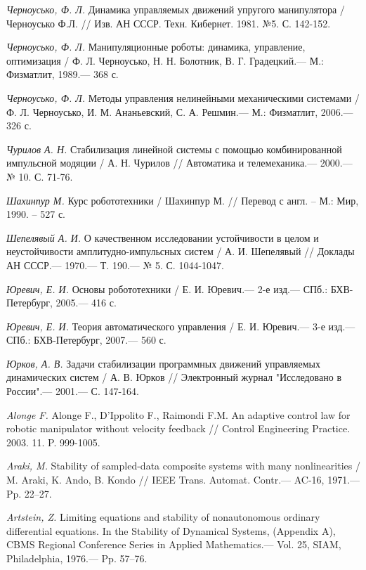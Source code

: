 \begin{thebibliography}{10}
	{\it Черноусько, Ф. Л.} Динамика управляемых движений упругого манипулятора / Черноусько Ф.Л. // Изв. АН СССР. Техн. Кибернет. 1981. №5. С. 142-152.
	
	{\it Черноусько, Ф. Л.} Манипуляционные роботы: динамика, управление, оптимизация /
	Ф. Л. Черноусько, Н. Н. Болотник, В. Г. Градецкий.— М.: Физматлит, 1989.— 368 с.
	
	{\it Черноусько, Ф. Л.} Методы управления нелинейными механическими системами /
	Ф. Л. Черноусько, И. М. Ананьевский, С. А. Решмин.— М.: Физматлит, 2006.— 326 с.
	
	{\it Чурилов А. Н.} Стабилизация линейной системы с помощью комбинированной импульсной модяции /
	А. Н. Чурилов // Автоматика и телемеханика.— 2000.— № 10. С. 71-76.
	
	{\it Шахинпур М.} Курс робототехники / Шахинпур М. // Перевод с англ. – М.: Мир, 1990. – 527 с. 
	
	{\it Шепелявый А. И.} О качественном исследовании устойчивости в целом и неустойчивости амплитудно-импульсных систем /
	А. И. Шепелявый // Доклады АН СССР.— 1970.— Т. 190.— № 5. С. 1044-1047.
	
	
	{\it Юревич, Е. И.} Основы робототехники / Е. И. Юревич.— 2-е изд.— СПб.:
	БХВ-Петербург, 2005.— 416 с.
	
	{\it Юревич, Е. И.} Теория автоматического управления / Е. И. Юревич.— 3-е изд.— СПб.:
	БХВ-Петербург, 2007.— 560 с.
	
	{\it Юрков, А. В.} Задачи стабилизации программных движений управляемых динамических систем / А. В. Юрков // Электронный журнал "Исследовано в России".— 2001.— С. 147-164.
	
	{\it Alonge F.} Alonge F., D’Ippolito F., Raimondi F.M. An adaptive control law for robotic manipulator without velocity feedback // Control Engineering Practice. 2003. 11. P. 999-1005.
	
	{\it Araki, M.} Stability of sampled-data composite systems with many nonlinearities / M. Araki, K. Ando, B. Kondo // IEEE Trans. Automat. Contr.— AC-16, 1971.— Pp. 22–27.
	
	{\it Artstein, Z.} Limiting equations and stability of nonautonomous ordinary differential equations. In the Stability of Dynamical Systems, (Appendix A), CBMS Regional Conference Series in Applied Mathematics.— Vol. 25, SIAM, Philadelphia, 1976.— Pp. 57–76.
	

\end{thebibliography}
